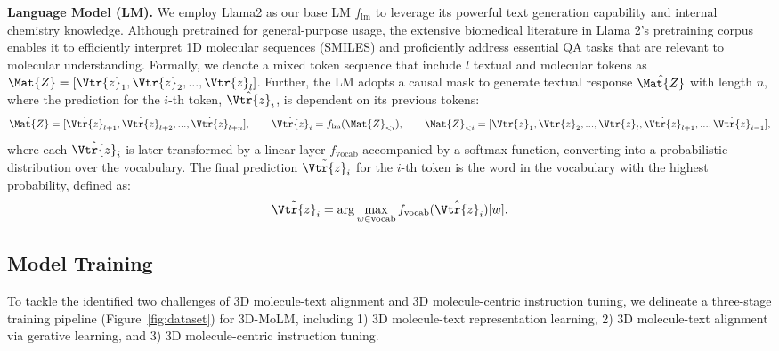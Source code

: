 \textbf{Language Model (LM).}
We employ Llama2 \citep{llama2} as our base LM $f_{\text{lm}}$ to leverage its powerful text generation capability and internal chemistry knowledge. Although pretrained for general-purpose usage, the extensive biomedical literature in Llama 2's pretraining corpus enables it to efficiently interpret 1D molecular sequences (\eg SMILES) and proficiently address essential QA tasks that are relevant to molecular understanding.  Formally, we denote a mixed token sequence that include $l$ textual and molecular tokens as $\Mat{Z} = [\Vtr{z}_1, \Vtr{z}_2,...,\Vtr{z}_l]$. 
Further, the LM adopts a causal mask to generate textual response $\hat{\Mat{Z}}$ with length $n$, where the prediction for the $i$-th token, $\hat{\Vtr{z}}_i$, is dependent on its previous tokens:
\begin{equation}\label{language-model}
\hat{\Mat{Z}} = [\hat{\Vtr{z}}_{l+1}, \hat{\Vtr{z}}_{l+2},...,\hat{\Vtr{z}}_{l+n}], \qquad \hat{\Vtr{z}}_i = f_{\text{lm}}(\Mat{Z}_{<i}), \qquad \Mat{Z}_{<i} = [\Vtr{z}_1, \Vtr{z}_2,...,\Vtr{z}_{l},\hat{\Vtr{z}}_{l+1},...,\hat{\Vtr{z}}_{i-1}],
\end{equation}
where each $\hat{\Vtr{z}}_i$ is later transformed by a linear layer $f_{\text{vocab}}$ accompanied by a softmax function, converting into a probabilistic distribution over the vocabulary.
The final prediction $\tilde{\Vtr{z}}_i$ for the $i$-th token is the word in the vocabulary with the highest probability, defined as:
\begin{equation}\label{language-model-word}
\tilde{\Vtr{z}}_i=\arg \max_{w \in \text{vocab}} f_{\text{vocab}}(\hat{\Vtr{z}}_i)[w].
\end{equation}
\vspace{-2mm}

\subsection{Model Training}
\label{sec:model_training}
\vspace{-2mm}
To tackle the identified two challenges of 3D molecule-text alignment and 3D molecule-centric instruction tuning, we delineate a three-stage training pipeline (\cf Figure~\ref{fig:dataset}) for 3D-MoLM, including 1) 3D molecule-text representation learning, 2) 3D molecule-text alignment via gerative learning, and 3) 3D molecule-centric instruction tuning.

